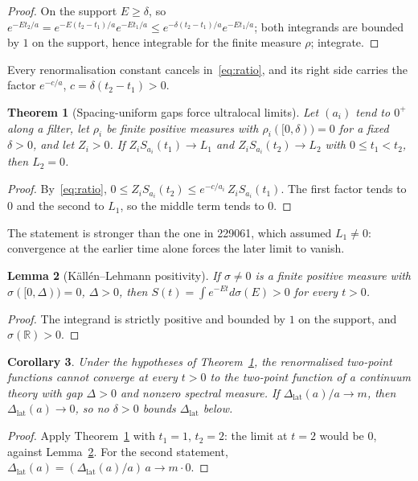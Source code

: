 \documentclass[aps,prd,twocolumn,superscriptaddress,nofootinbib,floatfix]{revtex4-2}
\newtheorem{theorem}{Theorem}
\newtheorem{lemma}[theorem]{Lemma}
\newtheorem{corollary}[theorem]{Corollary}
\theoremstyle{definition}
\theoremstyle{remark}
\newcommand{\R}{\mathbb{R}}
\newcommand{\Dlat}{\Delta_{\mathrm{lat}}}
\begin{document}
\begin{proof}
On the support $E\ge\delta$, so
$e^{-Et_2/a}=e^{-E(t_2-t_1)/a}e^{-Et_1/a}\le
e^{-\delta(t_2-t_1)/a}e^{-Et_1/a}$; both integrands are bounded by $1$ on
the support, hence integrable for the finite measure $\rho$; integrate.
\end{proof}

Every renormalisation constant cancels in~\eqref{eq:ratio}, and its right
side carries the factor $e^{-c/a}$, $c=\delta(t_2-t_1)>0$.

\begin{theorem}[Spacing-uniform gaps force ultralocal limits]
\label{thm:nogo}
Let $(a_i)$ tend to $0^+$ along a filter, let $\rho_i$ be finite positive
measures with $\rho_i([0,\delta))=0$ for a fixed $\delta>0$, and let
$Z_i>0$. If $Z_iS_{a_i}(t_1)\to L_1$ and $Z_iS_{a_i}(t_2)\to L_2$ with
$0\le t_1<t_2$, then $L_2=0$.
\end{theorem}

\begin{proof}
By~\eqref{eq:ratio},
$0\le Z_iS_{a_i}(t_2)\le e^{-c/a_i}\,Z_iS_{a_i}(t_1)$. The first factor
tends to $0$ and the second to $L_1$, so the middle term tends to $0$.
\end{proof}

The statement is stronger than the one in 229061, which assumed $L_1\ne0$:
convergence at the earlier time alone forces the later limit to vanish.

\begin{lemma}[K\"all\'en--Lehmann positivity]
\label{lem:KL}
If $\sigma\ne0$ is a finite positive measure with $\sigma([0,\Delta))=0$,
$\Delta>0$, then $S(t)=\int e^{-Et}d\sigma(E)>0$ for every $t>0$.
\end{lemma}

\begin{proof}
The integrand is strictly positive and bounded by $1$ on the support, and
$\sigma(\R)>0$.
\end{proof}

\begin{corollary}
\label{cor:nogap}
Under the hypotheses of Theorem~\ref{thm:nogo}, the renormalised two-point
functions cannot converge at every $t>0$ to the two-point function of a
continuum theory with gap $\Delta>0$ and nonzero spectral measure. If
$\Dlat(a)/a\to m$, then $\Dlat(a)\to0$, so no $\delta>0$ bounds $\Dlat$
below.
\end{corollary}

\begin{proof}
Apply Theorem~\ref{thm:nogo} with $t_1=1$, $t_2=2$: the limit at $t=2$
would be $0$, against Lemma~\ref{lem:KL}. For the second statement,
$\Dlat(a)=(\Dlat(a)/a)\,a\to m\cdot0$.
\end{proof}
\end{document}
